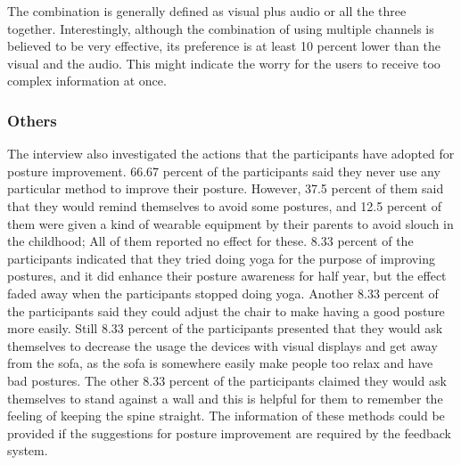 The combination is generally defined as visual plus audio or all the three together. Interestingly, although the combination of using multiple channels is believed to be very effective, its preference is at least 10 percent lower than the visual and the audio. This might indicate the worry for the users to receive too complex information at once.

\subsubsection{Others}
The interview also investigated the actions that the participants have adopted for posture improvement. 66.67 percent of the participants said they never use any particular method to improve their posture. However, 37.5 percent of them said that they would remind themselves to avoid some postures, and 12.5 percent of them were given a kind of wearable equipment by their parents to avoid slouch in the childhood; All of them reported no effect for these. 8.33 percent of the participants indicated that they tried doing yoga for the purpose of improving postures, and it did enhance their posture awareness for half year, but the effect faded away when the participants stopped doing yoga. Another 8.33 percent of the participants said they could adjust the chair to make having a good posture more easily. Still 8.33 percent of the participants presented that they would ask themselves to decrease the usage the devices with visual displays and get away from the sofa, as the sofa is somewhere easily make people too relax and have bad postures. The other 8.33 percent of the participants claimed they would ask themselves to stand against a wall and this is helpful for them to remember the feeling of keeping the spine straight. The information of these methods could be provided if the suggestions for posture improvement are required by the feedback system.
